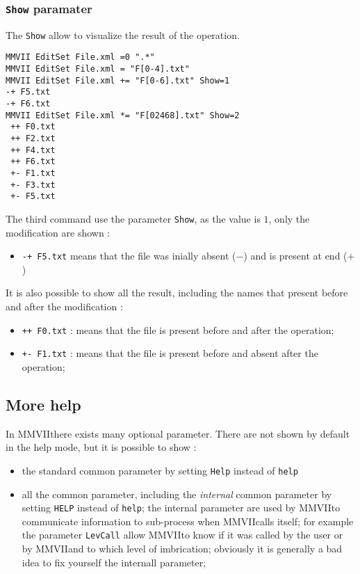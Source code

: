 \documentclass[a4paper]{book}
\newcommand{\PPP}{MMVII}
\begin{document}

\subsubsection{{\tt Show} paramater}

The {\tt Show} allow to visualize the result of the operation.

\begin{verbatim}
MMVII EditSet File.xml =0 ".*"
MMVII EditSet File.xml = "F[0-4].txt"
MMVII EditSet File.xml += "F[0-6].txt" Show=1
-+ F5.txt
-+ F6.txt
MMVII EditSet File.xml *= "F[02468].txt" Show=2
 ++ F0.txt
 ++ F2.txt
 ++ F4.txt
 ++ F6.txt
 +- F1.txt
 +- F3.txt
 +- F5.txt
\end{verbatim}

The third command use the parameter {\tt Show}, as the value is $1$,
only the modification are shown : 

\begin{itemize}
   \item {\tt -+ F5.txt} means that the file was inially absent ($-$) and is present at end ($+$)
\end{itemize}

It is also possible to show all the result, including the names that
present before and after the modification :

\begin{itemize}
   \item {\tt ++ F0.txt} : means that the file is present before and after the operation;
   \item {\tt +- F1.txt} : means that the file is present before and absent after the operation;
\end{itemize}



\subsection{More help}

In \PPP there exists many optional parameter. There are not shown by default in the help mode,
but it is possible to show :

\begin{itemize}
   \item  the standard common parameter by setting {\tt Help} instead of {\tt help}

   \item  all the common parameter, including the \emph{internal} common parameter
          by setting {\tt HELP} instead of {\tt help}; the internal parameter are used
          by \PPP to communicate information to sub-process  when  \PPP  calls itself;
          for example the parameter {\tt LevCall} allow \PPP to know if it was called
          by the user or by \PPP and to which level of imbrication; obviously it is generally
          a bad idea to fix yourself the internall parameter;
\end{itemize}
\end{document}
